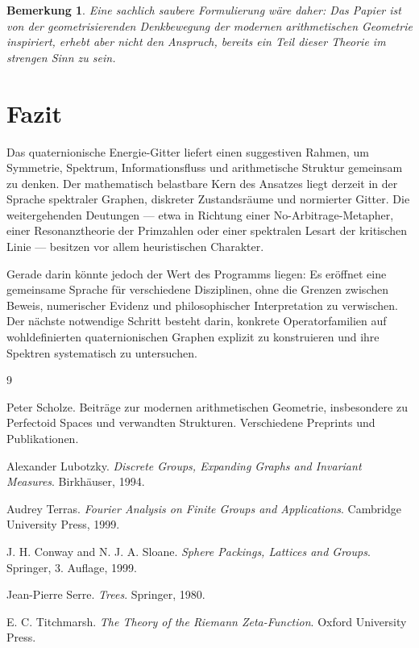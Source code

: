 \documentclass[12pt,a4paper]{article}
\newtheorem{remark}[theorem]{Bemerkung}
\begin{document}
	\begin{remark}
		Eine sachlich saubere Formulierung wäre daher: Das Papier ist von der geometrisierenden Denkbewegung der modernen arithmetischen Geometrie inspiriert, erhebt aber nicht den Anspruch, bereits ein Teil dieser Theorie im strengen Sinn zu sein.
	\end{remark}
	
	\section{Fazit}
	
	Das quaternionische Energie-Gitter liefert einen suggestiven Rahmen, um Symmetrie, Spektrum, Informationsfluss und arithmetische Struktur gemeinsam zu denken. Der mathematisch belastbare Kern des Ansatzes liegt derzeit in der Sprache spektraler Graphen, diskreter Zustandsräume und normierter Gitter. Die weitergehenden Deutungen --- etwa in Richtung einer No-Arbitrage-Metapher, einer Resonanztheorie der Primzahlen oder einer spektralen Lesart der kritischen Linie --- besitzen vor allem heuristischen Charakter.
	
	Gerade darin könnte jedoch der Wert des Programms liegen: Es eröffnet eine gemeinsame Sprache für verschiedene Disziplinen, ohne die Grenzen zwischen Beweis, numerischer Evidenz und philosophischer Interpretation zu verwischen. Der nächste notwendige Schritt besteht darin, konkrete Operatorfamilien auf wohldefinierten quaternionischen Graphen explizit zu konstruieren und ihre Spektren systematisch zu untersuchen.
	
	\begin{thebibliography}{9}
		
		Peter Scholze.
		\newblock Beiträge zur modernen arithmetischen Geometrie, insbesondere zu Perfectoid Spaces und verwandten Strukturen.
		\newblock Verschiedene Preprints und Publikationen.
		
		Alexander Lubotzky.
		\newblock \textit{Discrete Groups, Expanding Graphs and Invariant Measures}.
		\newblock Birkhäuser, 1994.
		
		Audrey Terras.
		\newblock \textit{Fourier Analysis on Finite Groups and Applications}.
		\newblock Cambridge University Press, 1999.
		
		J. H. Conway and N. J. A. Sloane.
		\newblock \textit{Sphere Packings, Lattices and Groups}.
		\newblock Springer, 3. Auflage, 1999.
		
		Jean-Pierre Serre.
		\newblock \textit{Trees}.
		\newblock Springer, 1980.
		
		E. C. Titchmarsh.
		\newblock \textit{The Theory of the Riemann Zeta-Function}.
		\newblock Oxford University Press.
		
	\end{thebibliography}
	
\end{document}
